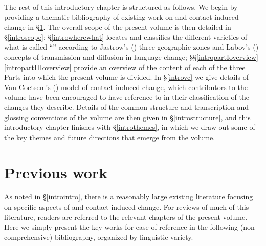 \documentclass[output=paper]{langsci/langscibook}
\begin{document}
The rest of this introductory chapter is structured as follows. We begin by providing a thematic bibliography of existing work on  and contact-induced change in §\ref{introexistingwork}. The overall scope of the present volume is then detailed in §\ref{introscope}: §\ref{introwherewhat} locates and classifies the different varieties of what is called ``'' according to Jastrow's (\citeyear{Jastrow2002}) three geographic zones and Labov's (\citeyear{Labov2007}) concepts of {transmission} and {diffusion} in {language change}; §§\ref{intropartIoverview}--\ref{intropartIIIoverview} provide an overview of the content of each of the three Parts into which the present volume is divided. In §\ref{introvc} we give details of Van Coetsem's (\citeyear{VanCoetsem1988,VanCoetsem2000}) model of contact-induced change, which contributors to the volume have been encouraged to have reference to in their classification of the changes they describe. Details of the common structure and transcription and glossing conventions of the volume are then given in §\ref{introstructure}, and this introductory chapter finishes with §\ref{introthemes}, in which we draw out some of the key themes and {future} directions that emerge from the volume.


\section{Previous work}\label{introexistingwork}

As noted in §\ref{introintro}, there is a reasonably large existing literature {focusing} on specific aspects of  and contact-induced change. For reviews of much of this literature, readers are referred to the relevant chapters of the present volume. Here we simply present the key works for ease of reference in the following (non-comprehensive) bibliography, organized by linguistic variety.
\end{document}
